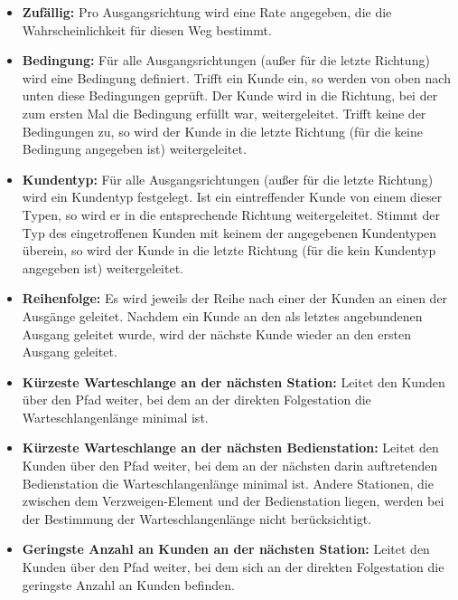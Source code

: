 \begin{itemize}
  \item 
    \textbf{Zufällig:}
    Pro Ausgangsrichtung wird eine Rate angegeben, die die Wahrscheinlichkeit für diesen Weg bestimmt.

  \item 
    \textbf{Bedingung:}
    Für alle Ausgangsrichtungen (außer für die letzte Richtung) wird eine Bedingung definiert. Trifft ein
    Kunde ein, so werden von oben nach unten diese Bedingungen geprüft. Der Kunde wird in die Richtung,
    bei der zum ersten Mal die Bedingung erfüllt war, weitergeleitet. Trifft keine der Bedingungen zu,
    so wird der Kunde in die letzte Richtung (für die keine Bedingung angegeben ist) weitergeleitet.    

  \item 
    \textbf{Kundentyp:}
    Für alle Ausgangsrichtungen (außer für die letzte Richtung) wird ein Kundentyp festgelegt. Ist ein
    eintreffender Kunde von einem dieser Typen, so wird er in die entsprechende Richtung weitergeleitet.
    Stimmt der Typ des eingetroffenen Kunden mit keinem der angegebenen Kundentypen überein,
    so wird der Kunde in die letzte Richtung (für die kein Kundentyp angegeben ist) weitergeleitet.

  \item 
    \textbf{Reihenfolge:}
    Es wird jeweils der Reihe nach einer der Kunden an einen der Ausgänge geleitet. Nachdem ein Kunde
    an den als letztes angebundenen Ausgang geleitet wurde, wird der nächste Kunde wieder an den
    ersten Ausgang geleitet. 

  \item 
    \textbf{Kürzeste Warteschlange an der nächsten Station:}
    Leitet den Kunden über den Pfad weiter, bei dem an der direkten Folgestation
    die Warteschlangenlänge minimal ist.

  \item 
    \textbf{Kürzeste Warteschlange an der nächsten Bedienstation:}
    Leitet den Kunden über den Pfad weiter, bei dem an der nächsten
    darin auftretenden Bedienstation die Warteschlangenlänge minimal ist.
    Andere Stationen, die zwischen dem Verzweigen-Element und der
    Bedienstation liegen, werden bei der Bestimmung der Warteschlangenlänge
    nicht berücksichtigt.

  \item 
    \textbf{Geringste Anzahl an Kunden an der nächsten Station:}
    Leitet den Kunden über den Pfad weiter, bei dem sich an der direkten Folgestation
    die geringste Anzahl an Kunden befinden.


\end{itemize}
